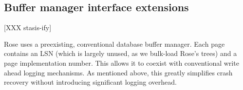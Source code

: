 \documentclass{vldb}
\newcommand{\rows}{Rose\xspace}
\newcommand{\rowss}{Rose's\xspace}
\begin{document}





\subsection{Buffer manager interface extensions}

[XXX stasis-ify]

\rows uses a preexisting, conventional database buffer manager.  Each
page contains an LSN (which is largely unused, as we bulk-load \rowss
trees) and a page implementation number.  This allows it to coexist
with conventional write ahead logging mechanisms.  As mentioned above,
this greatly simplifies crash recovery without introducing significant
logging overhead.
\end{document}
